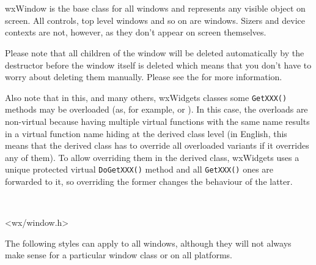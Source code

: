 
\section{}\label{wxwindow}

wxWindow is the base class for all windows and represents any visible object on
screen. All controls, top level windows and so on are windows. Sizers and
device contexts are not, however, as they don't appear on screen themselves.

Please note that all children of the window will be deleted automatically by
the destructor before the window itself is deleted which means that you don't
have to worry about deleting them manually. Please see the  for more information.

Also note that in this, and many others, wxWidgets classes some
\texttt{GetXXX()} methods may be overloaded (as, for example,
 or
). In this case, the overloads
are non-virtual because having multiple virtual functions with the same name
results in a virtual function name hiding at the derived class level (in
English, this means that the derived class has to override all overloaded
variants if it overrides any of them). To allow overriding them in the derived
class, wxWidgets uses a unique protected virtual \texttt{DoGetXXX()} method
and all \texttt{GetXXX()} ones are forwarded to it, so overriding the former
changes the behaviour of the latter.


\\


<wx/window.h>


The following styles can apply to all windows, although they will not always make sense for a particular
window class or on all platforms.

